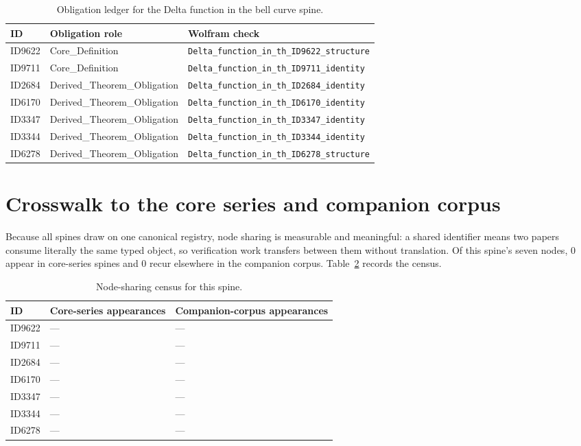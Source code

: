 \documentclass[11pt]{article}
\theoremstyle{remark}
\begin{document}
\begin{table}[ht]
\centering
\small
\caption{Obligation ledger for the Delta function in the bell curve spine.}
\label{tab:obligations}
\begin{tabular}{llp{6.2cm}}
\toprule
ID & Obligation role & Wolfram check \\
\midrule
ID9622 & Core\_Definition & \texttt{Delta\_function\_in\_th\_ID9622\_structure} \\
ID9711 & Core\_Definition & \texttt{Delta\_function\_in\_th\_ID9711\_identity} \\
ID2684 & Derived\_Theorem\_Obligation & \texttt{Delta\_function\_in\_th\_ID2684\_identity} \\
ID6170 & Derived\_Theorem\_Obligation & \texttt{Delta\_function\_in\_th\_ID6170\_identity} \\
ID3347 & Derived\_Theorem\_Obligation & \texttt{Delta\_function\_in\_th\_ID3347\_identity} \\
ID3344 & Derived\_Theorem\_Obligation & \texttt{Delta\_function\_in\_th\_ID3344\_identity} \\
ID6278 & Derived\_Theorem\_Obligation & \texttt{Delta\_function\_in\_th\_ID6278\_structure} \\
\bottomrule
\end{tabular}
\end{table}

\section{Crosswalk to the core series and companion corpus}
\label{sec:crosswalk}

Because all spines draw on one canonical registry, node sharing is measurable and meaningful: a shared identifier means two papers consume literally the same typed object, so verification work transfers between them without translation. Of this spine's seven nodes, 0 appear in core-series spines and 0 recur elsewhere in the companion corpus. Table~\ref{tab:crosswalk} records the census.

\begin{table}[ht]
\centering
\small
\caption{Node-sharing census for this spine.}
\label{tab:crosswalk}
\begin{tabular}{lp{4.4cm}p{6.6cm}}
\toprule
ID & Core-series appearances & Companion-corpus appearances \\
\midrule
ID9622 & --- & --- \\
ID9711 & --- & --- \\
ID2684 & --- & --- \\
ID6170 & --- & --- \\
ID3347 & --- & --- \\
ID3344 & --- & --- \\
ID6278 & --- & --- \\
\bottomrule
\end{tabular}
\end{table}
\end{document}
